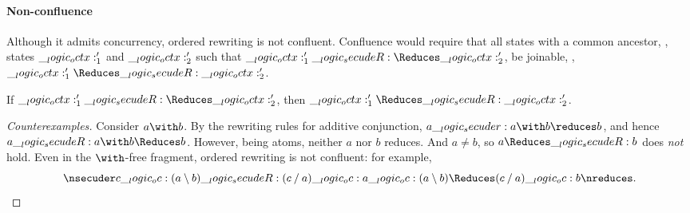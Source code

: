 







\paragraph*{Non-confluence}

Although it admits concurrency, ordered rewriting is not confluent.
Confluence would require that all states with a common ancestor, \ie, states $\__logic_octx:'_1$ and $\__logic_octx:'_2$ such that $\octx'_1 \secudeR\Reduces \octx'_2$, be joinable, \ie, $\octx'_1 \Reduces\secudeR \octx'_2$.
%
\begin{falseclaim}[Confluence]
  If\/ $\octx'_1 \secudeR\Reduces \octx'_2$, then $\octx'_1 \Reduces\secudeR \octx'_2$.
\end{falseclaim}
%
\begin{proof}[Counterexamples]
  Consider $a \with b$.
  By the rewriting rules for additive conjunction, $a \secuder a \with b \reduces b$, and hence $a \secudeR a \with b \Reduces b$.
  However, being atoms, neither $a$ nor $b$ reduces.
  And $a \neq b$, so $a \Reduces\secudeR b$ does \emph{not} hold.
  Even in the $\with$-free fragment, ordered rewriting is not confluent:
  for example,
  \begin{equation*}
    \nsecuder c \oc (a \limp b) \secudeR (c \pmir a) \oc a \oc (a \limp b) \Reduces (c \pmir a) \oc b \nreduces
    .
    \qedhere
  \end{equation*}
\end{proof}


